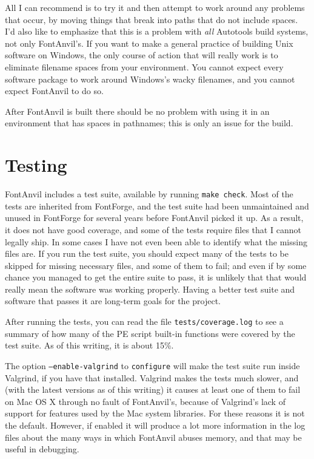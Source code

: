 All I can recommend is to try it and then attempt to work around
any problems that occur, by moving things that break into paths that do
not include spaces.  I'd also like to emphasize that this is a problem
with \emph{all} Autotools build systems, not only FontAnvil's.  If you want
to make a general practice of building Unix software on Windows, the only
course of action that will really work is to eliminate filename spaces from
your environment.  You cannot expect every software package to work around
Windows's wacky filenames, and you cannot expect FontAnvil to do so.

After FontAnvil is built there should be no problem with using it in an
environment that has spaces in pathnames; this is only an issue for the
build.

\section{Testing}

FontAnvil includes a test suite, available by running \texttt{make check}. 
Most of the tests are inherited from FontForge, and the test suite had been
unmaintained and unused in FontForge for several years before FontAnvil
picked it up.  As a result, it does not have good coverage, and some of the
tests require files that I cannot legally ship.  In some cases I have not
even been able to identify what the missing files are.  If you run the test
suite, you should expect many of the tests to be skipped for missing
necessary files, and some of them to fail; and even if by some chance you
managed to get the entire suite to pass, it is unlikely that that would
really mean the software was working properly.  Having a better test suite
and software that passes it are long-term goals for the project.

After running the tests, you can read the file \texttt{tests/coverage.log}
to see a summary of how many of the PE script built-in functions were
covered by the test suite.  As of this writing, it is about 15\%.

The option \texttt{--enable-valgrind} to \texttt{configure} will make the
test suite run inside Valgrind, if you have that installed.  Valgrind
makes the tests much slower, and (with the latest versions as of this
writing) it causes at least one of them to fail on Mac OS X through no fault
of FontAnvil's, because of Valgrind's lack of support for features used by
the Mac system libraries.  For these reasons it is not the default. 
However, if enabled it will produce a lot more information in the log files
about the many ways in which FontAnvil abuses memory, and that may be useful
in debugging.

